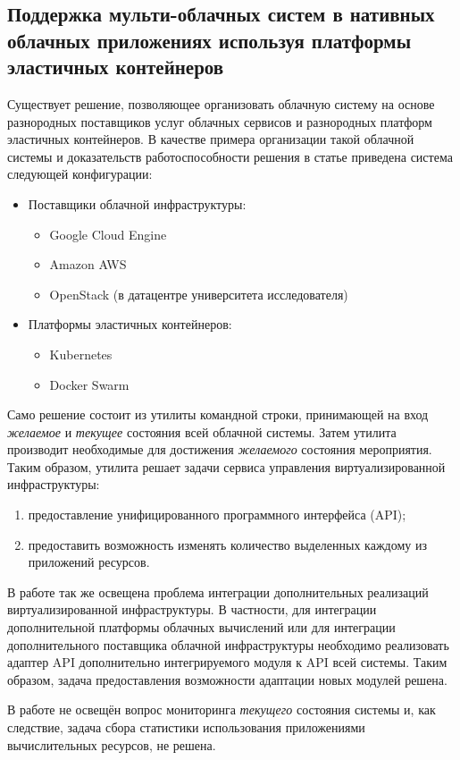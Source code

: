 \subsection{Поддержка мульти-облачных систем в нативных облачных приложениях используя платформы эластичных контейнеров}
Существует решение\cite{smuggling}, позволяющее организовать облачную систему на основе разнородных поставщиков услуг облачных сервисов и разнородных платформ эластичных контейнеров.
В качестве примера организации такой облачной системы и доказательств работоспособности решения в статье приведена система следующей конфигурации:
\begin{itemize}
    \item Поставщики облачной инфраструктуры:
    \begin{itemize}
        \item Google Cloud Engine
        \item Amazon AWS
        \item OpenStack (в датацентре университета исследователя)
    \end{itemize}
    \item Платформы эластичных контейнеров:
    \begin{itemize}
        \item Kubernetes
        \item Docker Swarm
    \end{itemize}
\end{itemize}

Само решение состоит из утилиты командной строки, принимающей на вход \textit{желаемое} и \textit{текущее} состояния всей облачной системы. 
Затем утилита производит необходимые для достижения \textit{желаемого} состояния мероприятия.
Таким образом, утилита решает задачи сервиса управления виртуализированной инфраструктуры:
\begin{enumerate}
    \item предоставление унифицированного программного интерфейса (API);
    \item предоставить возможность изменять количество выделенных каждому из приложений ресурсов.
\end{enumerate}

В работе так же освещена проблема интеграции дополнительных реализаций виртуализированной инфраструктуры.
В частности, для интеграции дополнительной платформы облачных вычислений или для интеграции дополнительного поставщика облачной инфраструктуры необходимо реализовать адаптер API дополнительно интегрируемого модуля к API всей системы.
Таким образом, задача предоставления возможности адаптации новых модулей решена.

В работе не освещён вопрос мониторинга \textit{текущего} состояния системы и, как следствие, задача сбора статистики использования приложениями вычислительных ресурсов, не решена.